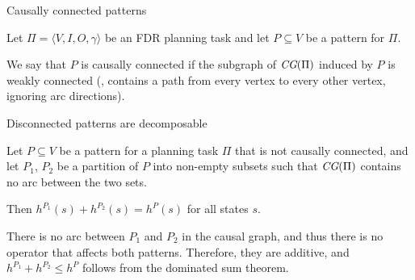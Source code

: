 \documentclass{gkibeamer}
\begin{document}
\begin{frame}{Causally connected patterns}
  \begin{definition}
    Let $\Pi = \langle V, I, O, \gamma\rangle$ be an FDR planning task
    and let $P \subseteq V$ be a pattern for $\Pi$.

    We say that $P$ is \alert{causally connected} if the subgraph of
    $\textit{CG}(\Pi)$ induced by $P$ is weakly connected (\ie, contains a
    path from every vertex to every other vertex, ignoring arc
    directions).
  \end{definition}
\end{frame}

\begin{frame}{Disconnected patterns are decomposable}
  \begin{theorem}
    Let $P \subseteq V$ be a pattern for a {\sasplus} planning task
    $\Pi$ that is not causally connected, and let $P_1$, $P_2$ be a
    partition of $P$ into non-empty subsets such that $\textit{CG}(\Pi)$
    contains no arc between the two sets.

    Then $h^{P_1}(s) + h^{P_2}(s) = h^P(s)$ for all states $s$.
  \end{theorem}

  \pause

  \begin{proofstart}
    \hilite{$(\le)$:} There is no arc between $P_1$ and $P_2$ in the
    causal graph, and thus there is no operator that affects both
    patterns. Therefore, they are additive, and $h^{P_1} + h^{P_2} \le
    h^P$ follows from the dominated sum theorem.
  \end{proofstart}
\end{frame}
\end{document}
